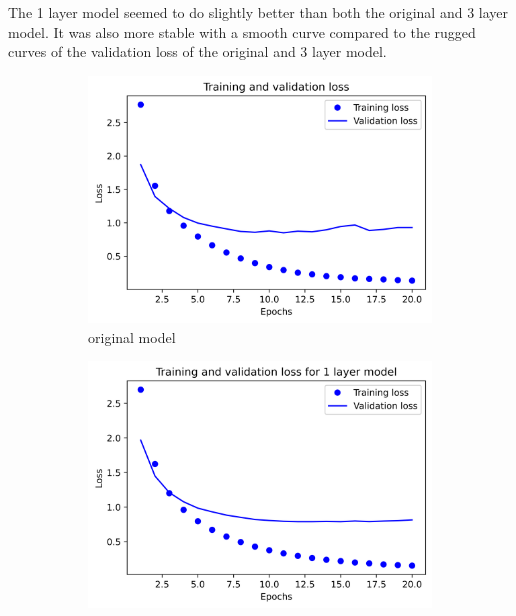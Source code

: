 \documentclass{article}
\begin{document}
    The 1 layer model seemed to do slightly better than both the original and 3 layer model. 
    It was also more stable with a smooth curve compared to the rugged curves of the validation 
    loss of the original and 3 layer model.


    \begin{figure}[H]
        \begin{subfigure}{.5\textwidth}
            \centering
            \includegraphics[width=\linewidth]{images/reuters/original.png}
            \caption{original model}
            \label{fig5:sfig1}
        \end{subfigure}
        \begin{subfigure}{.5\textwidth}
            \centering
            \includegraphics[width=\linewidth]{images/reuters/4.png}

\end{subfigure}
\end{figure}
\end{document}
